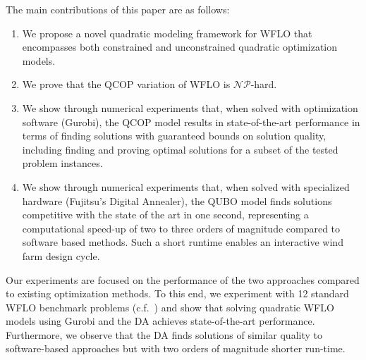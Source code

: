 \documentclass[preprint,12pt]{elsarticle}
\begin{document}
The main
contributions of this paper are as follows:
\begin{enumerate} 
\item We propose a novel quadratic modeling framework for WFLO that encompasses both constrained and unconstrained quadratic optimization models.
\item We prove that the QCOP variation of WFLO is $\mathcal{NP}$-hard.

\item We show through numerical experiments that, when solved with optimization software (Gurobi), the QCOP model results in state-of-the-art performance in terms of finding solutions with guaranteed bounds on solution quality, including finding and proving optimal solutions for a subset of the tested problem instances.

\item We show through numerical experiments that, when solved with specialized hardware (Fujitsu's Digital Annealer), the QUBO model finds solutions competitive with the state of the art in one second, representing a computational speed-up of two to three orders of magnitude compared to software based methods. Such a short runtime enables an interactive wind farm design cycle.
  

\end{enumerate}

Our experiments are focused on the performance of the two approaches
compared to 
existing optimization methods. To this end,
we experiment with 12 standard WFLO benchmark problems (c.f.~\cite{turner2014new})
and show that solving quadratic WFLO models
using Gurobi and the DA
achieves state-of-the-art performance.
Furthermore, we observe that the DA finds solutions of
similar quality to software-based approaches but with two orders of
magnitude shorter run-time.
\end{document}
